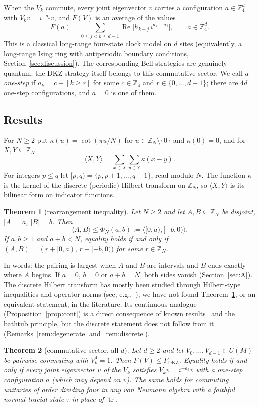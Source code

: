 \documentclass[11pt]{amsart}
\newtheorem{introthm}{Theorem}
\theoremstyle{definition}
\theoremstyle{remark}
\newcommand{\Z}{\mathbb{Z}}
\newcommand{\ip}[2]{\langle #1,#2\rangle}
\newcommand{\tr}{\operatorname{tr}}
\renewcommand{\Re}{\operatorname{Re}}
\newcommand{\FD}{F_{\mathrm{DKZ}}}
\begin{document}
When the $V_k$ commute, every joint eigenvector $v$ carries a configuration $a\in\Z_4^d$ with
$V_kv=i^{-a_k}v$, and $F(V)$ is an average of the values
\begin{equation}\label{eq:Fa}
F(a)=\sum_{0\le j<k\le d-1}\Re\bigl[h_{k-j}\,i^{a_k-a_j}\bigr],\qquad a\in\Z_4^d .
\end{equation}
This is a classical long-range four-state clock model on $d$ sites (equivalently, a long-range Ising ring with
antiperiodic boundary conditions, Section~\ref{sec:discussion}). The corresponding Bell strategies are genuinely
quantum: the DKZ strategy itself belongs to this commutative sector. We call $a$ \emph{one-step} if
$a_k=c+[k\ge r]$ for some $c\in\Z_4$ and $r\in\{0,\dots,d-1\}$; there are $4d$ one-step configurations, and
$a=0$ is one of them.

\subsection{Results}
For $N\ge2$ put $\kappa(u)=\cot(\pi u/N)$ for $u\in\Z_N\setminus\{0\}$ and $\kappa(0)=0$, and for $X,Y\subseteq\Z_N$
\[
\ip XY=\sum_{x\in X}\sum_{y\in Y}\kappa(x-y).
\]
For integers $p\le q$ let $[p,q)=\{p,p+1,\dots,q-1\}$, read modulo $N$. The function $\kappa$ is the kernel of the
discrete (periodic) Hilbert transform on $\Z_N$, so $\ip XY$ is its bilinear form on indicator functions.

\begin{introthm}[rearrangement inequality]\label{thm:A}
Let $N\ge 2$ and let $A,B\subseteq\Z_N$ be disjoint, $|A|=a$, $|B|=b$. Then
\[
\ip AB\le \Phi_N(a,b):=\ip{[0,a)}{[-b,0)} .
\]
If $a,b\ge1$ and $a+b<N$, equality holds if and only if $(A,B)=(r+[0,a),\,r+[-b,0))$ for some $r\in\Z_N$.
\end{introthm}

In words: the pairing is largest when $A$ and $B$ are intervals and $B$ ends exactly where $A$ begins. If $a=0$,
$b=0$ or $a+b=N$, both sides vanish (Section~\ref{sec:A}). The discrete Hilbert transform has mostly been studied
through Hilbert-type inequalities and operator norms (see, e.g.,~\cite{MV,BK}); we have not found
Theorem~\ref{thm:A}, or an equivalent statement, in the literature. Its continuous analogue
(Proposition~\ref{prop:cont}) is a direct consequence of known results~\cite{SW,Laeng} and the bathtub principle,
but the discrete statement does not follow from it (Remarks~\ref{rem:degenerate} and~\ref{rem:discrete}).

\begin{introthm}[commutative sector, all $d$]\label{thm:B}
Let $d\ge 2$ and let $V_0,\dots,V_{d-1}\in U(M)$ be pairwise commuting with $V_k^4=1$. Then $F(V)\le\FD$.
Equality holds if and only if every joint eigenvector $v$ of the $V_k$ satisfies $V_kv=i^{-a_k}v$ with a
one-step configuration $a$ (which may depend on $v$). The same holds for commuting unitaries of order dividing
four in any von Neumann algebra with a faithful normal tracial state $\tau$ in place of $\tr$.
\end{introthm}
\end{document}
